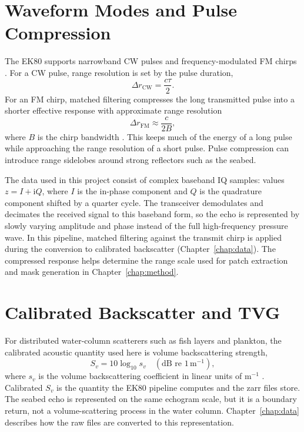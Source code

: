 \section{Waveform Modes and Pulse Compression}

The EK80 supports narrowband CW pulses and frequency-modulated FM chirps \cite{demer_evaluation_2017,andersen_quantitative_2024}. For a CW pulse, range resolution is set by the pulse duration,
\begin{equation}
    \Delta r_{\text{CW}} = \frac{c\tau}{2}.
\end{equation}
For an FM chirp, matched filtering compresses the long transmitted pulse into a shorter effective response with approximate range resolution
\begin{equation}
    \Delta r_{\text{FM}} \approx \frac{c}{2B},
\end{equation}
where $B$ is the chirp bandwidth \cite{demer_evaluation_2017}. This keeps much of the energy of a long pulse while approaching the range resolution of a short pulse. Pulse compression can introduce range sidelobes around strong reflectors such as the seabed.

The data used in this project consist of complex baseband IQ samples: values $z = I + \mathrm{i}Q$, where $I$ is the in-phase component and $Q$ is the quadrature component shifted by a quarter cycle. The transceiver demodulates and decimates the received signal to this baseband form, so the echo is represented by slowly varying amplitude and phase instead of the full high-frequency pressure wave. In this pipeline, matched filtering against the transmit chirp is applied during the conversion to calibrated backscatter (Chapter~\ref{chap:data}). The compressed response helps determine the range scale used for patch extraction and mask generation in Chapter~\ref{chap:method}.

\section{Calibrated Backscatter and TVG}
\label{sec:sonar_eq}

For distributed water-column scatterers such as fish layers and plankton, the calibrated acoustic quantity used here is volume backscattering strength,
\begin{equation}
    S_v = 10 \log_{10} s_v \quad (\text{dB re } 1\,\text{m}^{-1}),
\end{equation}
where $s_v$ is the volume backscattering coefficient in linear units of m$^{-1}$ \cite{nerc_acoustic_volume_backscattering_strength,acoustics_unpacked_sonar_equation}. Calibrated $S_v$ is the quantity the EK80 pipeline computes and the zarr files store. The seabed echo is represented on the same echogram scale, but it is a boundary return, not a volume-scattering process in the water column. Chapter~\ref{chap:data} describes how the raw files are converted to this representation.

